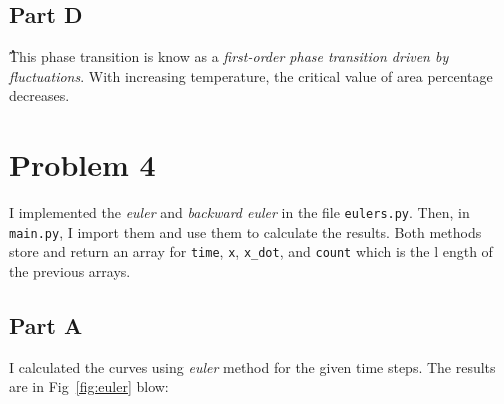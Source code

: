\documentclass[12pt, a4paper]{article}
\begin{document}
	\subsection{Part D}
	ُThis phase transition is know as a \emph{first-order phase transition driven by fluctuations}. With increasing temperature, the critical value of 
	area percentage decreases. 

	\section{Problem 4}
	I implemented the \emph{euler} and \emph{backward euler} in the file \texttt{eulers.py}. Then, in \texttt{main.py}, I import them and use them
	to calculate the results. Both methods store and return an array for \texttt{time}, \texttt{x}, \texttt{x\_dot}, and \texttt{count} which is the l
	ength of the previous arrays. 
	
	\subsection{Part A}
	I calculated the curves using \emph{euler} method for the given time steps. The results are in Fig~\ref{fig:euler} blow:
	
\end{document}
